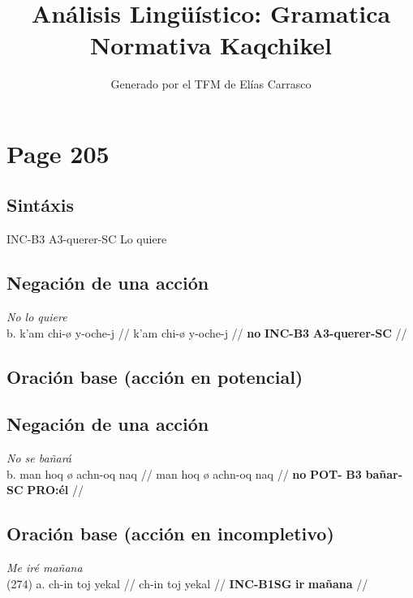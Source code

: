 \documentclass{article}%
\title{Análisis Lingüístico: Gramatica Normativa Kaqchikel}%
\author{Generado por el TFM de Elías Carrasco}%
\begin{document}
%
\normalsize%
\maketitle%
\section{Page 205}%
\label{sec:Page205}%
\subsection{Sintáxis}%
\label{subsec:Sintxis}%

%
INC{-}B3 %
A3{-}querer{-}SC %
Lo quiere %
\subsection{Negación de una acción}%
\label{subsec:Negacindeunaaccin}%

%
\par\medskip%
\ex
\textit{No lo quiere} \\
\begingl
\gla b. k'am chi-ø y-oche-j //
\glb k'am chi-ø y-oche-j //
\glc \textbf{no} \textbf{INC-}\textbf{B3} \textbf{A3-}\textbf{querer-}\textbf{SC} //
\endgl
\xe
%
\medskip%
\subsection{Oración base (acción en potencial)}%
\label{subsec:Oracinbase(accinenpotencial)}%

%
\subsection{Negación de una acción}%
\label{subsec:Negacindeunaaccin}%

%
\par\medskip%
\ex
\textit{No se bañará} \\
\begingl
\gla b. man hoq ø achn-oq naq //
\glb man hoq ø achn-oq naq //
\glc \textbf{no} \textbf{POT-} \textbf{B3} \textbf{bañar-}\textbf{SC} \textbf{PRO:él} //
\endgl
\xe
%
\medskip%
\subsection{Oración base (acción en incompletivo)}%
\label{subsec:Oracinbase(accinenincompletivo)}%

%
\par\medskip%
\ex
\textit{Me iré mañana} \\
\begingl
\gla (274) a. ch-in toj yekal //
\glb ch-in toj yekal //
\glc \textbf{INC-}\textbf{B1SG} \textbf{ir} \textbf{mañana} //
\endgl
\xe
%
\medskip%
\end{document}
